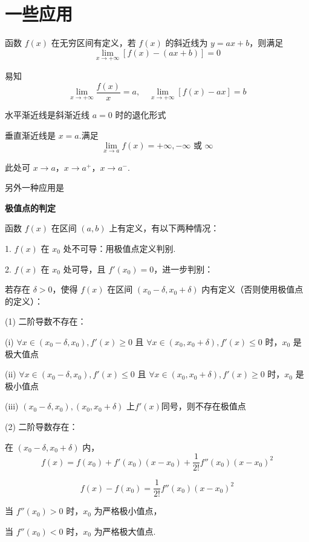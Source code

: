 \section{一些应用}
\begin{definition}
	函数 $f(x)$ 在无穷区间有定义，若 $f(x)$ 的斜近线为 $y = ax + b$，则满足
	\[
	\lim_{x \to +\infty} \left[ f(x) - (ax + b) \right] = 0
	\]
	
	易知
	\[
	\lim_{x \to +\infty} \frac{f(x)}{x} = a, \quad \lim_{x \to +\infty} \left[ f(x) - ax \right] = b
	\]
	
	水平渐近线是斜渐近线 $a=0$ 时的退化形式
	
	垂直渐近线是 $x=a$.满足
	\[
	\lim_{x \to a} f(x) = +\infty, -\infty \text{ 或 } \infty
	\]
	
	此处可 $x \to a$，$x \to a^+$，$x \to a^-$.
\end{definition}
另外一种应用是

\textbf{极值点的判定}
	
	函数 $f(x)$ 在区间 $(a, b)$ 上有定义，有以下两种情况：
	
	1. $f(x)$ 在 $x_0$ 处不可导：用极值点定义判别.
	
	2. $f(x)$ 在 $x_0$ 处可导，且 $f'(x_0) = 0$，进一步判别：
	
	若存在 $\delta > 0$，使得 $f(x)$ 在区间 $(x_0 - \delta, x_0 + \delta)$ 内有定义（否则使用极值点的定义）：
	
	(1) 二阶导数不存在：
	
	(i) $\forall x \in (x_0 - \delta, x_0), f'(x)\geqslant0$ 且 $\forall x \in (x_0, x_0 + \delta), f'(x)\leqslant0$ 时，$x_0$ 是极大值点
	
	(ii) $\forall x \in (x_0 - \delta, x_0), f'(x)\leqslant0$ 且 $\forall x \in (x_0, x_0 + \delta), f'(x)\geqslant0$ 时，$x_0$ 是极小值点
	
	(iii) $(x_0 - \delta,x_0),(x_0, x_0 + \delta)$ 上$f'(x)$同号，则不存在极值点
	
	(2) 二阶导数存在：
	
	在 $(x_0 - \delta, x_0 + \delta)$ 内，
	\[ f(x) = f(x_0) + f'(x_0)(x-x_0) + \frac{1}{2!} f''(x_0)(x-x_0)^2 \]
	
	\[ f(x) - f(x_0) = \frac{1}{2!} f''(x_0)(x-x_0)^2 \]
	
	当 $f''(x_0) > 0$ 时，$x_0$ 为严格极小值点，
	
	当 $f''(x_0) < 0$ 时，$x_0$ 为严格极大值点.

